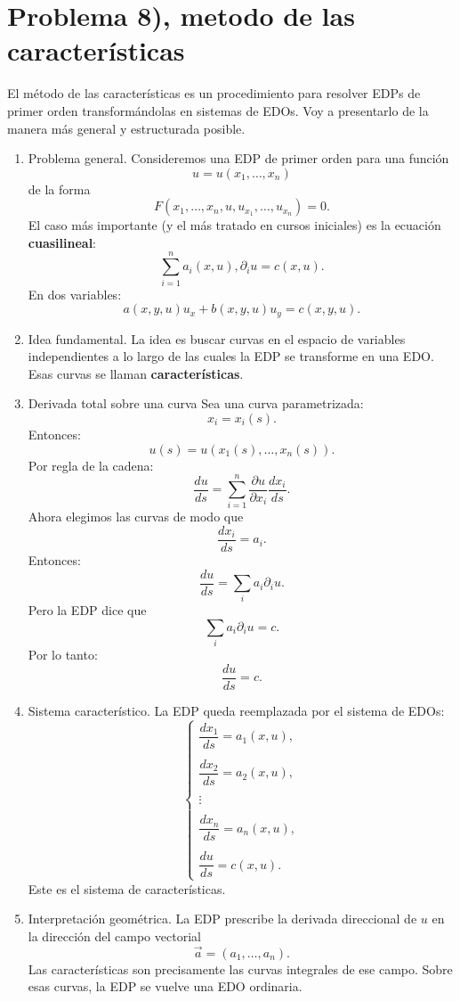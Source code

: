 \documentclass[11pt,spanish]{article}
\begin{document}
\section{Problema 8), metodo de las caracter\'isticas}

El método de las características es un procedimiento para resolver EDPs de primer orden transformándolas en sistemas de EDOs. Voy a presentarlo de la manera más general y estructurada posible.

\begin{enumerate}
\item Problema general.
Consideremos una EDP de primer orden para una función
$$
u=u(x_1,\dots,x_n)
$$
de la forma
$$
F(x_1,\dots,x_n,u,u_{x_1},\dots,u_{x_n})=0.
$$
El caso más importante (y el más tratado en cursos iniciales) es la ecuación {\bf cuasilineal}:
$$
\sum_{i=1}^n a_i(x,u),\partial_i u = c(x,u).
$$
En dos variables:
$$
a(x,y,u)u_x+b(x,y,u)u_y=c(x,y,u).
$$

\item Idea fundamental.
La idea es buscar curvas en el espacio de variables independientes a lo largo de las cuales la EDP se transforme en una EDO.
Esas curvas se llaman {\bf características}.

\item Derivada total sobre una curva
Sea una curva parametrizada:
$$
x_i=x_i(s).
$$
Entonces:
$$
u(s)=u(x_1(s),\dots,x_n(s)).
$$
Por regla de la cadena:
$$
\frac{du}{ds}
=
\sum_{i=1}^n
\frac{\partial u}{\partial x_i}
\frac{dx_i}{ds}.
$$
Ahora elegimos las curvas de modo que
$$
\frac{dx_i}{ds}=a_i.
$$
Entonces:
$$
\frac{du}{ds}
=
\sum_i a_i \partial_i u.
$$
Pero la EDP dice que
$$
\sum_i a_i \partial_i u=c.
$$
Por lo tanto:
$$
\boxed{
\frac{du}{ds}=c.
}
$$

\item Sistema característico.
La EDP queda reemplazada por el sistema de EDOs:
$$
\boxed{
\begin{cases}
\dfrac{dx_1}{ds}=a_1(x,u), \\
\\
\dfrac{dx_2}{ds}=a_2(x,u), \\
\\
\vdots \\
\\
\dfrac{dx_n}{ds}=a_n(x,u), \\
\\
\dfrac{du}{ds}=c(x,u).
\end{cases}
}
$$
Este es el sistema de características.

\item Interpretación geométrica.
La EDP prescribe la derivada direccional de $u$ en la dirección del campo vectorial
$$
\vec a=(a_1,\dots,a_n).
$$
Las características son precisamente las curvas integrales de ese campo.
Sobre esas curvas, la EDP se vuelve una EDO ordinaria.


\end{enumerate}
\end{document}
